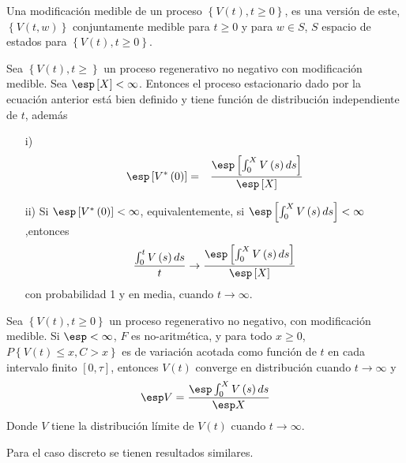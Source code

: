 \begin{Def}
Una modificaci\'on medible de un proceso $\left\{V\left(t\right),t\geq0\right\}$, es una versi\'on de este, $\left\{V\left(t,w\right)\right\}$ conjuntamente medible para $t\geq0$ y para $w\in S$, $S$ espacio de estados para $\left\{V\left(t\right),t\geq0\right\}$.
\end{Def}

\begin{Teo}
Sea $\left\{V\left(t\right),t\geq\right\}$ un proceso regenerativo no negativo con modificaci\'on medible. Sea $\esp\left[X\right]<\infty$. Entonces el proceso estacionario dado por la ecuaci\'on anterior est\'a bien definido y tiene funci\'on de distribuci\'on independiente de $t$, adem\'as
\begin{itemize}
\item[i)] \begin{eqnarray*}
\esp\left[V^{*}\left(0\right)\right]&=&\frac{\esp\left[\int_{0}^{X}V\left(s\right)ds\right]}{\esp\left[X\right]}\end{eqnarray*}
\item[ii)] Si $\esp\left[V^{*}\left(0\right)\right]<\infty$, equivalentemente, si $\esp\left[\int_{0}^{X}V\left(s\right)ds\right]<\infty$,entonces
\begin{eqnarray*}
\frac{\int_{0}^{t}V\left(s\right)ds}{t}\rightarrow\frac{\esp\left[\int_{0}^{X}V\left(s\right)ds\right]}{\esp\left[X\right]}
\end{eqnarray*}
con probabilidad 1 y en media, cuando $t\rightarrow\infty$.
\end{itemize}
\end{Teo}

\begin{Coro}
Sea $\left\{V\left(t\right),t\geq0\right\}$ un proceso regenerativo no negativo, con modificaci\'on medible. Si $\esp <\infty$, $F$ es no-aritm\'etica, y para todo $x\geq0$, $P\left\{V\left(t\right)\leq x,C>x\right\}$ es de variaci\'on acotada como funci\'on de $t$ en cada intervalo finito $\left[0,\tau\right]$, entonces $V\left(t\right)$ converge en distribuci\'on  cuando $t\rightarrow\infty$ y $$\esp V=\frac{\esp \int_{0}^{X}V\left(s\right)ds}{\esp X}$$
Donde $V$ tiene la distribuci\'on l\'imite de $V\left(t\right)$ cuando $t\rightarrow\infty$.

\end{Coro}

Para el caso discreto se tienen resultados similares.




